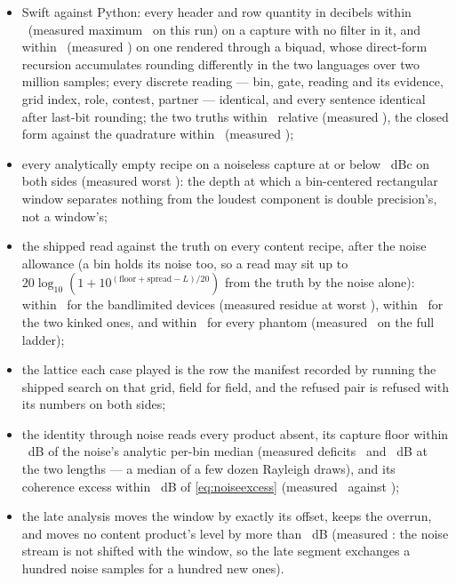 \documentclass[11pt,a4paper]{article}
\begin{document}
{\sloppy
\begin{itemize}
  \item Swift against Python: every header and row quantity in decibels
  within \iparitySwift\ (measured maximum \iparityWorstSwift\ on this run)
  on a capture with no filter in it, and within \iparitySwiftFiltered\
  (measured \iparityWorstSwiftFiltered) on one rendered through a biquad,
  whose direct-form recursion accumulates rounding differently in the two
  languages over two million samples; every discrete reading --- bin,
  gate, reading and its evidence, grid index, role, contest, partner ---
  identical, and every sentence identical after last-bit rounding; the two
  truths within \iparityTruthRelative\ relative (measured
  \iparityWorstTruthRelative), the closed form against the quadrature
  within \iparityClosedForm\ (measured \iparityWorstClosedForm);
  \item every analytically empty recipe on a noiseless capture at or below
  \iparityEmptyDepth\ dBc on both sides (measured worst
  \iparityWorstEmpty): the depth at which a bin-centered rectangular window
  separates nothing from the loudest component is double precision's, not
  a window's;
  \item the shipped read against the truth on every content recipe, after
  the noise allowance (a bin holds its noise too, so a read may sit up to
  $20\log_{10}(1 + 10^{(\mathrm{floor} + \mathrm{spread} - L)/20})$ from
  the truth by the noise alone): within \iparityTruthBandlimited\ for the
  bandlimited devices (measured residue at worst
  \iparityWorstBandlimitedResidue), within \iparityTruthKinked\ for the
  two kinked ones, and within \iparityTruthPhantom\ for every phantom
  (measured \iparityPhantomWorst\ on the full ladder);
  \item the lattice each case played is the row the manifest recorded by
  running the shipped search on that grid, field for field, and the
  refused pair is refused with its numbers on both sides;
  \item the identity through noise reads every product absent, its
  capture floor within \iparityFloor\ dB of the noise's analytic per-bin
  median (measured deficits \iparityFloorLongDeficit\ and
  \iparityFloorShortDeficit\ dB at the two lengths --- a median of a few
  dozen Rayleigh draws), and its coherence excess within
  \iparityCoherenceNoise\ dB of \eqref{eq:noiseexcess} (measured
  \iparityCleanExcess\ against \iparityCleanExpected);
  \item the late analysis moves the window by exactly its offset, keeps
  the overrun, and moves no content product's level by more than
  \iparityLatencyTolerance\ dB (measured \iparityWorstLatencyShift: the
  noise stream is not shifted with the window, so the late segment
  exchanges a hundred noise samples for a hundred new ones).
\end{itemize}
\par}
\iparityPartBStatus
\end{document}
